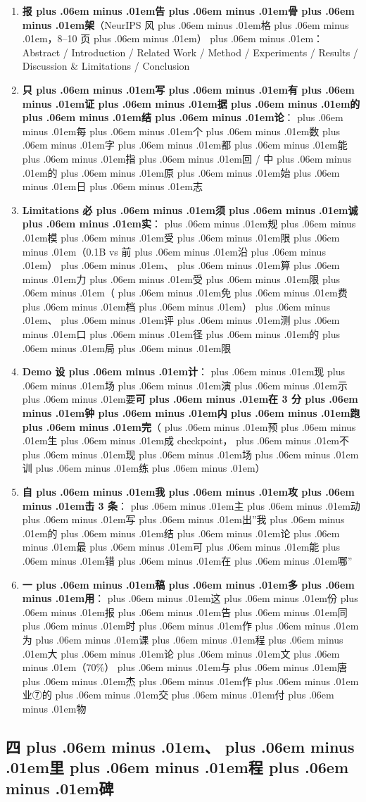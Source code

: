 \documentclass[
]{article}
\newcommand{\passthrough}[1]{#1}
\providecommand{\tightlist}{%
  \setlength{\itemsep}{0pt}\setlength{\parskip}{0pt}}
\def\zh#1{{\zhfont #1}}
\def\sym#1{{\symfont #1}}
\def\codezh#1{{\zhmonofont #1}}
\def\zhglue{\hskip0pt plus .06em minus .01em}
\begin{document}
\begin{enumerate}
\def\labelenumi{\arabic{enumi}.}
\tightlist
\item
  \textbf{\zh{报\zhglue 告\zhglue 骨\zhglue 架}}\zh{（}NeurIPS \zh{风\zhglue 格\zhglue ，}8--10 \zh{页\zhglue ）\zhglue ：}Abstract / Introduction / Related Work / Method / Experiments / Results / Discussion \& Limitations / Conclusion
\item
  \textbf{\zh{只\zhglue 写\zhglue 有\zhglue 证\zhglue 据\zhglue 的\zhglue 结\zhglue 论}}\zh{：\zhglue 每\zhglue 个\zhglue 数\zhglue 字\zhglue 都\zhglue 能\zhglue 指\zhglue 回} \passthrough{\codezh{{\zh{证}}{\zh{据}}/}} \zh{中\zhglue 的\zhglue 原\zhglue 始\zhglue 日\zhglue 志}
\item
  \textbf{Limitations \zh{必\zhglue 须\zhglue 诚\zhglue 实}}\zh{：\zhglue 规\zhglue 模\zhglue 受\zhglue 限\zhglue （}0.1B vs \zh{前\zhglue 沿\zhglue ）\zhglue 、\zhglue 算\zhglue 力\zhglue 受\zhglue 限\zhglue （\zhglue 免\zhglue 费\zhglue 档\zhglue ）\zhglue 、\zhglue 评\zhglue 测\zhglue 口\zhglue 径\zhglue 的\zhglue 局\zhglue 限}
\item
  \textbf{Demo \zh{设\zhglue 计}}\zh{：\zhglue 现\zhglue 场\zhglue 演\zhglue 示\zhglue 要}\textbf{\zh{可\zhglue 在} 3 \zh{分\zhglue 钟\zhglue 内\zhglue 跑\zhglue 完}}\zh{（\zhglue 预\zhglue 生\zhglue 成} checkpoint\zh{，\zhglue 不\zhglue 现\zhglue 场\zhglue 训\zhglue 练\zhglue ）}
\item
  \textbf{\zh{自\zhglue 我\zhglue 攻\zhglue 击} 3 \zh{条}}\zh{：\zhglue 主\zhglue 动\zhglue 写\zhglue 出}''\zh{我\zhglue 的\zhglue 结\zhglue 论\zhglue 最\zhglue 可\zhglue 能\zhglue 错\zhglue 在\zhglue 哪}''
\item
  \textbf{\zh{一\zhglue 稿\zhglue 多\zhglue 用}}\zh{：\zhglue 这\zhglue 份\zhglue 报\zhglue 告\zhglue 同\zhglue 时\zhglue 作\zhglue 为\zhglue 课\zhglue 程\zhglue 大\zhglue 论\zhglue 文\zhglue （}70\%\zh{）\zhglue 与\zhglue 唐\zhglue 杰\zhglue 作\zhglue 业}\sym{⑦}\zh{的\zhglue 交\zhglue 付\zhglue 物}
\end{enumerate}

\subsection{\zh{四\zhglue 、\zhglue 里\zhglue 程\zhglue 碑}}\label{ux56dbux91ccux7a0bux7891}
\end{document}
